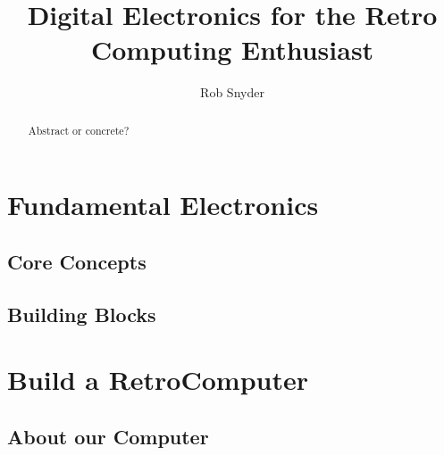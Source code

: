 \documentclass[10pt]{report}
\title{Digital Electronics for the Retro Computing Enthusiast}
\author{Rob Snyder}
\begin{document}
\maketitle

\begin{abstract}
Abstract or concrete?%
\end{abstract}

\tableofcontents

\part{Fundamental Electronics}

\chapter{Core Concepts}


\chapter{Building Blocks}


\part{Build a RetroComputer}

\chapter{About our Computer}

\end{document}

